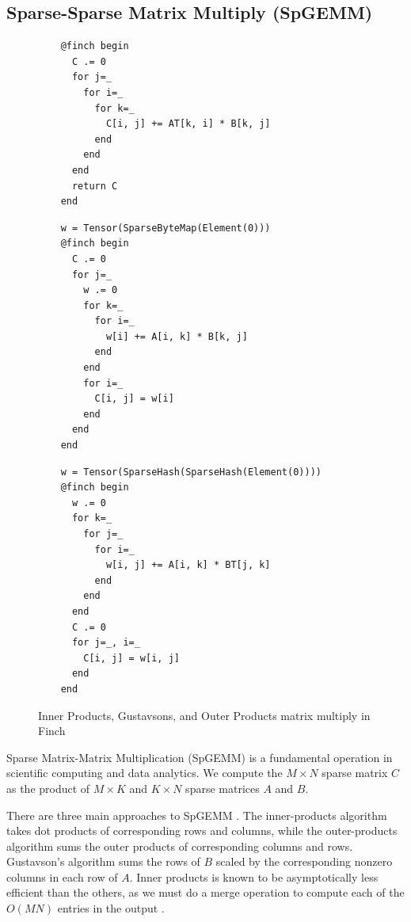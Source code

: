 \subsection{Sparse-Sparse Matrix Multiply (SpGEMM)}
\begin{figure}
    \begin{minipage}{0.333\linewidth}
    \begin{verbatim}
    @finch begin
      C .= 0
      for j=_
        for i=_
          for k=_
            C[i, j] += AT[k, i] * B[k, j]
          end
        end
      end
      return C
    end
    \end{verbatim}
    \end{minipage}%
    \begin{minipage}{0.333\linewidth}
    \begin{verbatim}
    w = Tensor(SparseByteMap(Element(0)))
    @finch begin
      C .= 0
      for j=_
        w .= 0
        for k=_
          for i=_
            w[i] += A[i, k] * B[k, j]
          end
        end
        for i=_
          C[i, j] = w[i]
        end
      end
    end
    \end{verbatim}
    \end{minipage}%
    \begin{minipage}{0.333\linewidth}
    \begin{verbatim}
    w = Tensor(SparseHash(SparseHash(Element(0))))
    @finch begin
      w .= 0
      for k=_
        for j=_
          for i=_
            w[i, j] += A[i, k] * BT[j, k]
          end
        end
      end
      C .= 0
      for j=_, i=_
        C[i, j] = w[i, j]
      end
    end
    \end{verbatim}
    \end{minipage}
    \vspace{-12pt}
    \caption{Inner Products, Gustavsons, and Outer Products matrix multiply in Finch}\label{fig:spgemm_listing}
    \vspace{-12pt}
\end{figure}

Sparse Matrix-Matrix Multiplication (SpGEMM) is a fundamental operation in scientific computing and data analytics. 
We compute the $M \times N$ sparse matrix $C$ as the product of $M \times K$ and $K \times N$ sparse matrices $A$ and $B$.

There are three main approaches to SpGEMM \cite[Section 2.2]{zhang2021gamma}.
%
The inner-products algorithm takes dot products of corresponding rows and columns, while the outer-products algorithm sums the outer products of corresponding columns and rows.
%
Gustavson's algorithm sums the rows of $B$ scaled by the corresponding nonzero columns in each row of $A$.
%
Inner products is known to be asymptotically less efficient than the others, as we must do a merge operation to compute each of the $O(MN)$ entries in the output \cite{ahrens2022autoscheduling}.

